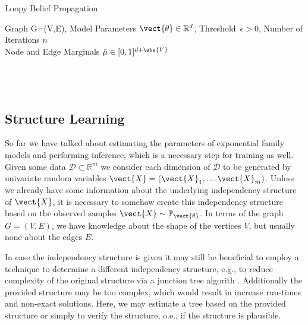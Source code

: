 \begin{algo}{Loopy Belief Propagation}
    \begin{algorithm}[H]
        \caption{Loopy Belief Propagation}
        \begin{algorithmic}
            \label{alg:lbp}
            \REQUIRE Graph G=(V,E), Model Parameters $\vect{\theta} \in \mathbb{R}^d$, Threshold~$\epsilon > 0$, Number of Iterations $n$\\
            \ENSURE  Node and Edge Marginals $\hat{\mu} \in [0,1]^{d + \abs{V}}$ \\
                \\
                \ENDFOR
                \\
                \\
                \ENDIF
            \ENDFOR
        \end{algorithmic}
    \end{algorithm}
\end{algo}
\subsection{Structure Learning}

So far we have talked about estimating the parameters of exponential family models and performing inference, which is a necessary step for training as well. 
Given some data $\mathcal{D} \subset \mathbb{R}^m$  we consider each dimension of $\mathcal{D}$ to be generated by univariate random variables $\vect{X} = (\vect{X}_1, \ldots \vect{X}_m)$.
Unless we already have some information about the underlying independency structure of $\vect{X}$, it is necessary to somehow create this independency structure based on the observed samples $\vect{X} \sim \mathbb{P}_{\vect{\theta}}$.
In terms of the graph $G=(V,E)$, we have knowledge about the shape of the vertices $V$, but usually none about the edges $E$.

In case the independency structure is given it may still be beneficial to employ a technique to determine a different independency structure, e.g., to reduce complexity of the original structure via a junction tree algorith .
Additionally the provided structure may be too complex, which would result in increase run-times and non-exact solutions.
Here, we may estimate a tree based on the provided structure or simply to verify the structure, o.e., if the structure is plausible.

